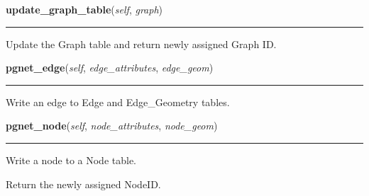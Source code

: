 \hspace{.8\funcindent}\begin{boxedminipage}{\funcwidth}

    \raggedright \textbf{update\_graph\_table}(\textit{self}, \textit{graph})

    \vspace{-1.5ex}

    \rule{\textwidth}{0.5\fboxrule}
\setlength{\parskip}{2ex}
    Update the Graph table and return newly assigned Graph ID.

\setlength{\parskip}{1ex}
    \end{boxedminipage}

    \label{nx_pgnet:write:pgnet_edge}

    \vspace{0.5ex}

\hspace{.8\funcindent}\begin{boxedminipage}{\funcwidth}

    \raggedright \textbf{pgnet\_edge}(\textit{self}, \textit{edge\_attributes}, \textit{edge\_geom})

    \vspace{-1.5ex}

    \rule{\textwidth}{0.5\fboxrule}
\setlength{\parskip}{2ex}
    Write an edge to Edge and Edge\_Geometry tables.

\setlength{\parskip}{1ex}
    \end{boxedminipage}

    \label{nx_pgnet:write:pgnet_node}

    \vspace{0.5ex}

\hspace{.8\funcindent}\begin{boxedminipage}{\funcwidth}

    \raggedright \textbf{pgnet\_node}(\textit{self}, \textit{node\_attributes}, \textit{node\_geom})

    \vspace{-1.5ex}

    \rule{\textwidth}{0.5\fboxrule}
\setlength{\parskip}{2ex}
    Write a node to a Node table.

    Return the newly assigned NodeID.

\setlength{\parskip}{1ex}
    \end{boxedminipage}


